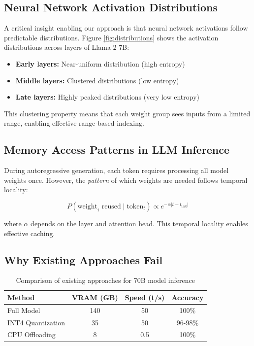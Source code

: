 \documentclass[twocolumn,10pt]{article}
\begin{document}
\subsection{Neural Network Activation Distributions}

A critical insight enabling our approach is that neural network activations follow predictable distributions. Figure \ref{fig:distributions} shows the activation distributions across layers of Llama 2 7B:

\begin{itemize}
    \item \textbf{Early layers:} Near-uniform distribution (high entropy)
    \item \textbf{Middle layers:} Clustered distributions (low entropy)  
    \item \textbf{Late layers:} Highly peaked distributions (very low entropy)
\end{itemize}

This clustering property means that each weight group sees inputs from a limited range, enabling effective range-based indexing.

\subsection{Memory Access Patterns in LLM Inference}

During autoregressive generation, each token requires processing all model weights once. However, the \textit{pattern} of which weights are needed follows temporal locality:

\begin{equation}
P(\text{weight}_i \text{ reused} \mid \text{token}_t) \propto e^{-\alpha |t - t_{\text{last}}|}
\end{equation}

where $\alpha$ depends on the layer and attention head. This temporal locality enables effective caching.

\subsection{Why Existing Approaches Fail}

\begin{table}[t]
\centering
\caption{Comparison of existing approaches for 70B model inference}
\begin{tabular}{lccc}
\toprule
\textbf{Method} & \textbf{VRAM (GB)} & \textbf{Speed (t/s)} & \textbf{Accuracy} \\
\midrule
Full Model & 140 & 50 & 100\% \\
INT4 Quantization & 35 & 50 & 96-98\% \\
CPU Offloading & 8 & 0.5 & 100\% \\
\bottomrule
\end{tabular}
\label{tab:comparison}
\end{table}
\end{document}
